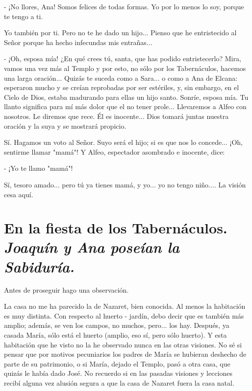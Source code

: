 \documentclass[12pt, twoside, openright]{book} %
\begin{document}
- ¡No llores, Ana! Somos felices de todas formas. Yo por lo menos lo soy, porque te tengo a ti. 

Yo también por ti. Pero no te he dado un hijo... Pienso que he entristecido al Señor porque ha hecho infecundas mis entrañas... 

- ¡Oh, esposa mía! ¿En qué crees tú, santa, que has podido entristecerlo? Mira, vamos una vez más al Templo y por esto, no sólo por los Tabernáculos, hacemos una larga oración... Quizás te suceda como a Sara... o como a Ana de Elcana: esperaron mucho y se creían reprobadas por ser estériles, y, sin embargo, en el Cielo de Dios, estaba madurando para ellas un hijo santo. Sonríe, esposa mía. Tu llanto significa para mí más dolor que el no tener prole... Llevaremos a Alfeo con nosotros. Le diremos que rece. Él es inocente... Dios tomará juntas nuestra oración y la suya y se mostrará propicio. 

Sí. Hagamos un voto al Señor. Suyo será el hijo; si es que nos lo concede... ¡Oh, sentirme llamar "mamá"! Y Alfeo, espectador asombrado e inocente, dice: 

- ¡Yo te llamo "mamá"! 

Sí, tesoro amado... pero tú ya tienes mamá, y yo... yo no tengo niño.... La visión cesa aquí. 

\chapter*{En la fiesta de los Tabernáculos. \\ \normalfont\normalsize\textit{Joaquín y Ana poseían la Sabiduría.}}
 
Antes de proseguir hago una observación. 

La casa no me ha parecido la de Nazaret, bien conocida. Al menos la habitación es muy distinta. Con respecto al huerto - jardín, debo decir que es también más amplio; además, se ven los campos, no muchos, pero... los hay. Después, ya casada María, sólo está el huerto (amplio, eso sí, pero sólo huerto). Y esta habitación que he visto no la he observado nunca en las otras visiones. No sé si pensar que por motivos pecuniarios los padres de María se hubieran deshecho de parte de su patrimonio, o si María, dejado el Templo, pasó a otra casa, que quizás le había dado José. No recuerdo si en las pasadas visiones y lecciones recibí alguna vez alusión segura a que la casa de Nazaret fuera la casa natal. 
\end{document}
